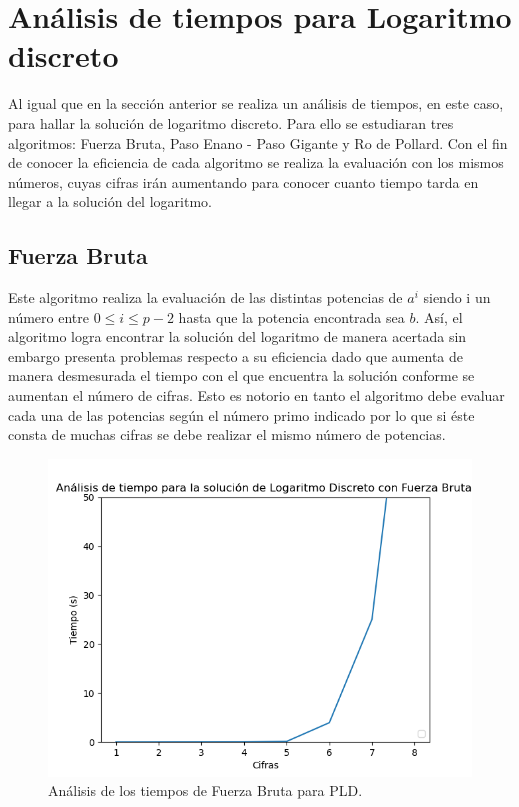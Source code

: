 \documentclass{article}
\begin{document}
    \newpage
    \section{Análisis de tiempos para Logaritmo discreto}
    Al igual que en la sección anterior se realiza un análisis de tiempos, en este caso, para hallar la solución de logaritmo discreto. Para ello se estudiaran tres algoritmos: Fuerza Bruta, Paso Enano - Paso Gigante y Ro de Pollard. 
    Con el fin de conocer la eficiencia de cada algoritmo se realiza la evaluación con los mismos números, cuyas cifras irán aumentando para conocer cuanto tiempo tarda en llegar a la solución del logaritmo.
    
    \subsection{Fuerza Bruta}
    Este algoritmo realiza la evaluación de las distintas potencias de \begin{math}a^i\end{math} siendo i un número entre \begin{math} 0\leq i \leq p-2 \end{math} hasta que la potencia encontrada sea \begin{math}b\end{math}. Así, el algoritmo logra encontrar la solución del logaritmo de manera acertada sin embargo presenta problemas respecto a su eficiencia dado que aumenta de manera desmesurada el tiempo con el que encuentra la solución conforme se aumentan el número de cifras. Esto es notorio en tanto el algoritmo debe evaluar cada una de las potencias según el número primo indicado por lo que si éste consta de muchas cifras se debe realizar el mismo número de potencias.
     \begin{figure}[ht!]
        \centering
        \includegraphics[scale=0.7]{Figure_7}
        \caption{Análisis de los tiempos de Fuerza Bruta para PLD.}
        \label{fig:Figure_6}
    \end{figure}
    \newpage
    
\end{document}
